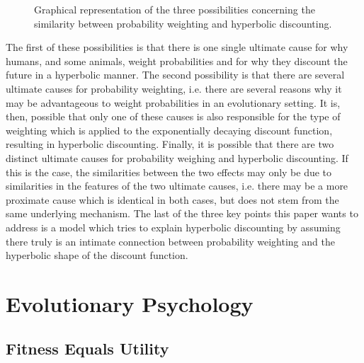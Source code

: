 \documentclass[a4paper,10pt]{article}
\numberwithin{equation}{section}
\begin{document}
\begin{figure}[h]
\begin{center}
\captionsetup{width=320pt}
\caption{Graphical representation of the three possibilities concerning the similarity between probability weighting and hyperbolic discounting.}
\label{fig:Graph9.pdf and Graph10.pdf and Graph11.pdf}
\end{center}
\end{figure}

The first of these possibilities is that there is one single ultimate cause for why humans, and some animals, weight probabilities and for why they discount the future in a hyperbolic manner. The second possibility is that there are several ultimate causes for probability weighting, i.e. there are several reasons why it may be advantageous to weight probabilities in an evolutionary setting. It is, then, possible that only one of these causes is also responsible for the type of weighting which is applied to the exponentially decaying discount function, resulting in hyperbolic discounting. Finally, it is possible that there are two distinct ultimate causes for probability weighing and hyperbolic discounting. If this is the case, the similarities between the two effects may only be due to similarities in the features of the two ultimate causes, i.e. there may be a more proximate cause which is identical in both cases, but does not stem from the same underlying mechanism. The last of the three key points this paper wants to address is a model which tries to explain hyperbolic discounting by assuming there truly is an intimate connection between probability weighting and the hyperbolic shape of the discount function.


\section{Evolutionary Psychology}
\label{sec:Evolutionary Psychology}
\subsection{Fitness Equals Utility}
\label{sec:Fitness Equals Utility}
\end{document}
